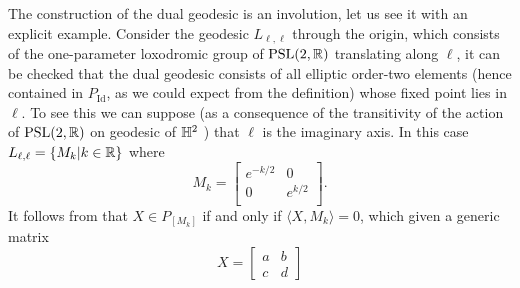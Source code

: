 The construction of the dual geodesic is an involution, let us see it with an explicit example. Consider the geodesic $L_{\ell,\ell}$ through the origin, which consists of the one-parameter loxodromic group of $\text{PSL}(2,\mathbb{R})$ translating along $\ell$, it can be checked that the dual geodesic consists of all elliptic order-two elements (hence contained in $P_{\text{Id}}$, as we could expect from the definition) whose fixed point lies in $\ell$. To see this we can suppose (as a consequence of the transitivity of the action of $\text{PSL}(2,\mathbb{R})$ on geodesic of $\mathbb{H}^2$ ) that $\ell$ is the imaginary axis. In this case $L_{\ell,\ell}=\{M_k|k\in\mathbb{R}\}$ where \[
    M_k=\begin{bmatrix}
        e^{-k/2} & 0 \\
        0 & e^{k/2} \\
    \end{bmatrix}.
    \]
It follows from  that $X\in P_{[M_k]}$ if and only if $\langle X, M_k\rangle=0$, which given a generic matrix
\[
    X=\begin{bmatrix}
        a & b \\

        c & d
        \end{bmatrix}
\]

